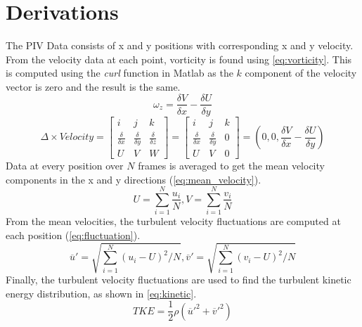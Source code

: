 \section{Derivations} \label{sec: Derivations}
The PIV Data consists of x and y positions with corresponding x and y velocity. From the velocity data at each point, vorticity is found using \autoref{eq:vorticity}. This is computed using the \textit{curl} function in Matlab as the $k$ component of the velocity vector is zero and the result is the same.
\begin{equation}\label{eq:vorticity}
    \omega _z = \frac{\delta V}{\delta x} - \frac{\delta U}{\delta y}
\end{equation}
\begin{equation}\label{eq:curl}
    \Delta \times Velocity = \begin{bmatrix} i & j & k \\ \frac{\delta}{\delta x} & \frac{\delta}{\delta y} & \frac{\delta}{\delta z} \\ U & V & W \end{bmatrix} = \begin{bmatrix} i & j & k \\ \frac{\delta}{\delta x} & \frac{\delta}{\delta y} & 0 \\ U & V & 0 \end{bmatrix} = (0,0,\frac{\delta V}{\delta x} - \frac{\delta U}{\delta y})
\end{equation}
Data at every position over $N$ frames is averaged to get the mean velocity components in the x and y directions (\autoref{eq:mean_velocity}). 
\begin{equation}\label{eq:mean_velocity}
    U = \sum^N_{i=1} \frac{u_i}{N}, V = \sum^N_{i=1} \frac{v_i}{N} 
\end{equation}
From the mean velocities, the turbulent velocity fluctuations are computed at each position (\autoref{eq:fluctuation}).
\begin{equation}\label{eq:fluctuation}
    \overline{u}' = \sqrt{\sum^N_{i=1}(u_i-U)^2/N},
    \overline{v}' = \sqrt{\sum^N_{i=1}(v_i-U)^2/N}
\end{equation}
Finally, the turbulent velocity fluctuations are used to find the turbulent kinetic energy distribution, as shown in \autoref{eq:kinetic}.
\begin{equation}\label{eq:kinetic}
    TKE = \frac{1}{2}\rho(\overline{u}'^2 + \overline{v}'^2)
\end{equation}

